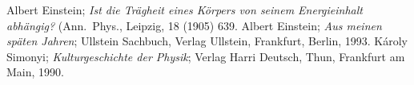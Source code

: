 \normalsize

\begin{thebibliography}{99}
 Albert Einstein; {\it Ist die Tr\"agheit eines
        K\"orpers von seinem Energieinhalt abh\"angig?} (Ann.\ Phys., 
        Leipzig, 18 (1905) 639.
 Albert Einstein; {\it Aus meinen sp\"aten Jahren};
         Ullstein Sachbuch, Verlag Ullstein, Frankfurt, Berlin, 1993.                 
      K\'aroly Simonyi; {\it Kulturgeschichte der Physik}; Verlag
       Harri Deutsch, Thun, Frankfurt am Main, 1990.
\end{thebibliography}

%
